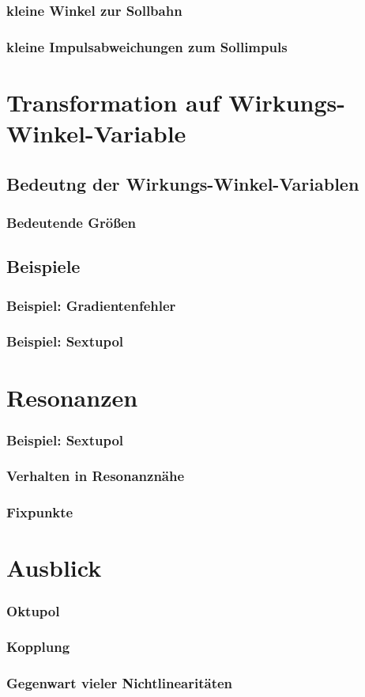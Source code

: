 \documentclass[hyperref={pdfpagelabels=false}]{beamer}
\begin{document}
\begin{frame}
 \frametitle{kleine Winkel zur Sollbahn}
\end{frame}

\begin{frame}
 \frametitle{kleine Impulsabweichungen zum Sollimpuls}
\end{frame}

\section{Transformation auf Wirkungs-Winkel-Variable}
\subsection{Bedeutng der Wirkungs-Winkel-Variablen}
\begin{frame}
 \frametitle{Bedeutende Größen}
\end{frame}

\subsection{Beispiele}
\begin{frame}
 \frametitle{Beispiel: Gradientenfehler}
\end{frame}

\begin{frame}
 \frametitle{Beispiel: Sextupol}
\end{frame}

\section{Resonanzen}
\begin{frame}
 \frametitle{Beispiel: Sextupol}
\end{frame}

\begin{frame}
 \frametitle{Verhalten in Resonanznähe}
\end{frame}

\begin{frame}
 \frametitle{Fixpunkte}
\end{frame}

\section{Ausblick}
\begin{frame}
 \frametitle{Oktupol}
\end{frame}

\begin{frame}
 \frametitle{Kopplung}
\end{frame}

\begin{frame}
 \frametitle{Gegenwart vieler Nichtlinearitäten}
\end{frame}
\end{document}
